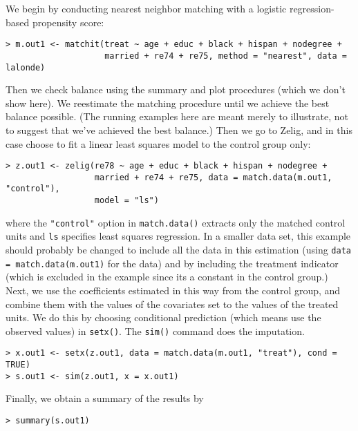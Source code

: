 \begin{description}
  We begin by conducting nearest neighbor matching with a logistic
  regression-based propensity score:
\begin{verbatim}
> m.out1 <- matchit(treat ~ age + educ + black + hispan + nodegree + 
                    married + re74 + re75, method = "nearest", data = lalonde)
\end{verbatim}
  Then we check balance using the summary and plot procedures (which
  we don't show here).  We reestimate the matching procedure until we
  achieve the best balance possible.  (The running examples here are meant merely to illustrate, not to suggest that we've achieved the best 
balance.)  Then we 
go to Zelig, and in this
  case choose to fit a linear least squares model to the control group
  only:
\begin{verbatim}
> z.out1 <- zelig(re78 ~ age + educ + black + hispan + nodegree + 
                  married + re74 + re75, data = match.data(m.out1, "control"), 
                  model = "ls")
\end{verbatim}
  where the {\tt "control"} option in {\tt match.data()} extracts only
  the matched control units and {\tt ls} specifies least squares
  regression.  In a smaller data set, this example should probably be
  changed to include all the data in this estimation (using
  \texttt{data = match.data(m.out1)} for the data) and by including
  the treatment indicator (which is excluded in the example since its
  a constant in the control group.)  Next, we use the coefficients
  estimated in this way from the control group, and combine them with
  the values of the covariates set to the values of the treated units.
  We do this by choosing conditional prediction (which means use the
  observed values) in \texttt{setx()}.  The {\tt sim()} command does
  the imputation.
\begin{verbatim}
> x.out1 <- setx(z.out1, data = match.data(m.out1, "treat"), cond = TRUE)
> s.out1 <- sim(z.out1, x = x.out1)
\end{verbatim}
Finally, we obtain a summary of the results by 
\begin{verbatim}
> summary(s.out1)
\end{verbatim}


\end{description}
